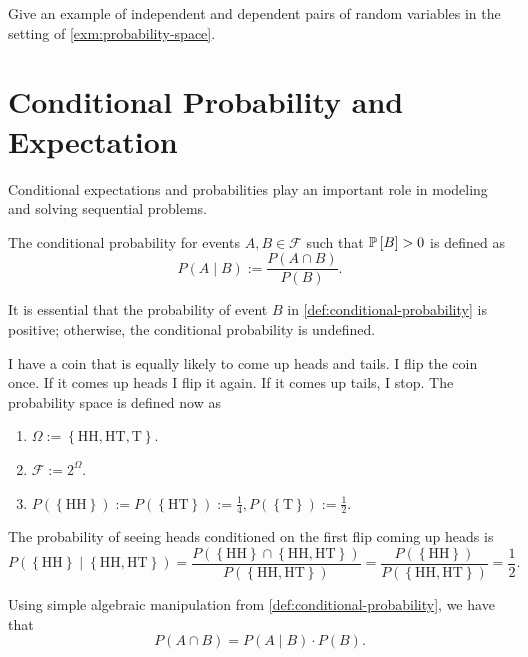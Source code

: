 \documentclass[letterpaper,11pt]{article}
\begin{document}
\begin{question}
Give an example of independent and dependent pairs of random variables in the setting of \cref{exm:probability-space}.
\end{question}


\section{Conditional Probability and Expectation}


Conditional expectations and probabilities play an important role in modeling and solving sequential problems. 
\begin{defn} \label{def:conditional-probability}
The conditional probability for events $A,B\in \mathcal{F}$ such that $\P{B} > 0$ is defined as
  \[
    P(A \mid B) := \frac{P(A \cap B)}{P(B)}.
  \]
\end{defn}
It is essential that the probability of event $B$ in \cref{def:conditional-probability} is positive; otherwise, the conditional probability is undefined.


\begin{example} \label{exm:probability-space-cond}
I have a coin that is equally likely to come up heads and tails. I flip the coin once. If it comes up heads I flip it again. If it comes up tails, I stop. The probability space is defined now as
  \begin{enumerate}
  \item $\Omega := \left\{ \mathrm{HH}, \mathrm{HT}, \mathrm{T} \right\}$.
  \item $\mathcal{F} := 2^{\Omega }$.
  \item $P(\left\{ \mathrm{HH} \right\}) := P(\left\{ \mathrm{HT} \right\}) := \frac{1}{4},  P(\left\{\mathrm{T} \right\}) := \frac{1}{2}$. 
  \end{enumerate}
  The probability of seeing heads conditioned on the first flip coming up heads is
  \[
    P(\left\{ \mathrm{HH}  \right\} \mid \left\{ \mathrm{HH}, \mathrm{HT} \right\}) =
    \frac{ P(\left\{ \mathrm{HH}  \right\} \cap \left\{ \mathrm{HH}, \mathrm{HT} \right\})}{ P(\left\{ \mathrm{HH}, \mathrm{HT} \right\})} =
    \frac{ P(\left\{ \mathrm{HH}  \right\})}{ P(\left\{ \mathrm{HH}, \mathrm{HT} \right\})} = \frac{1}{2}.
  \]
\end{example}


Using simple algebraic manipulation from \cref{def:conditional-probability}, we have that
\[
  P(A \cap B) = P(A \mid B) \cdot P(B)
 .
\]
\end{document}
